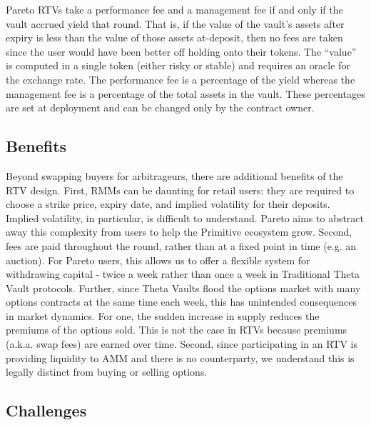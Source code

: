 \documentclass[hidelinks, 12pt]{article}
\begin{document}
Pareto RTVs take a performance fee and a management fee if and only if the vault accrued yield that round.
That is, if the value of the vault's assets after expiry is less than the value of those assets at-deposit, then no fees are taken since the user would have been better off holding onto their tokens.
The ``value'' is computed in a single token (either risky or stable) and requires an oracle for the exchange rate.
The performance fee is a percentage of the yield whereas the management fee is a percentage of the total assets in the vault. These percentages are set at deployment and can be changed only by the contract owner.

\subsection{Benefits}

Beyond swapping buyers for arbitrageurs, there are additional benefits of the RTV design. First, RMMs can be daunting for retail users: they are required to choose a strike price, expiry date, and implied volatility for their deposits. Implied volatility, in particular, is difficult to understand. Pareto aims to abstract away this complexity from users to help the Primitive ecosystem grow. Second, fees are paid throughout the round, rather than at a fixed point in time (e.g. an auction). For Pareto users, this allows us to offer a flexible system for withdrawing capital - twice a week rather than once a week in Traditional Theta Vault protocols. Further, since Theta Vaults flood the options market with many options contracts at the same time each week, this has unintended consequences in market dynamics. For one, the sudden increase in supply reduces the premiums of the options sold. This is not the case in RTVs because premiums (a.k.a. swap fees) are earned over time. Second, since participating in an RTV is providing liquidity to AMM and there is no counterparty, we understand this is legally distinct from buying or selling options.

\subsection{Challenges}
\label{Challenges}
\end{document}
